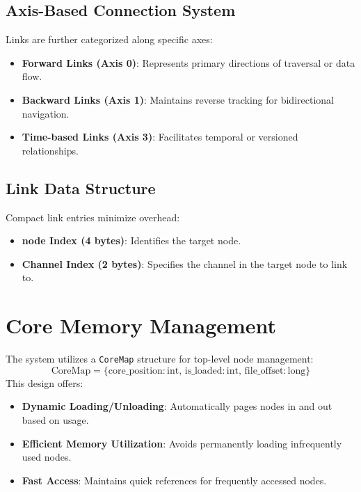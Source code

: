 \documentclass[12pt, a4paper]{article}
\begin{document}
\subsection{Axis-Based Connection System}
Links are further categorized along specific axes:
\begin{itemize}
    \item \textbf{Forward Links (Axis 0)}: Represents primary directions of traversal or data flow.
    \item \textbf{Backward Links (Axis 1)}: Maintains reverse tracking for bidirectional navigation.
    \item \textbf{Time-based Links (Axis 3)}: Facilitates temporal or versioned relationships.
\end{itemize}

\subsection{Link Data Structure}
Compact link entries minimize overhead:
\begin{itemize}
    \item \textbf{node Index (4 bytes)}: Identifies the target node.
    \item \textbf{Channel Index (2 bytes)}: Specifies the channel in the target node to link to.
\end{itemize}

\section{Core Memory Management}\label{Sec:CoreMemory}
The system utilizes a \texttt{CoreMap} structure for top-level node management:
\begin{equation}
    \mathrm{CoreMap} = \{\mathrm{core\_position}: \mathrm{int},\, \mathrm{is\_loaded}: \mathrm{int},\, \mathrm{file\_offset}: \mathrm{long}\}
\end{equation}
This design offers:
\begin{itemize}
    \item \textbf{Dynamic Loading/Unloading}: Automatically pages nodes in and out based on usage.
    \item \textbf{Efficient Memory Utilization}: Avoids permanently loading infrequently used nodes.
    \item \textbf{Fast Access}: Maintains quick references for frequently accessed nodes.
\end{itemize}
\end{document}
